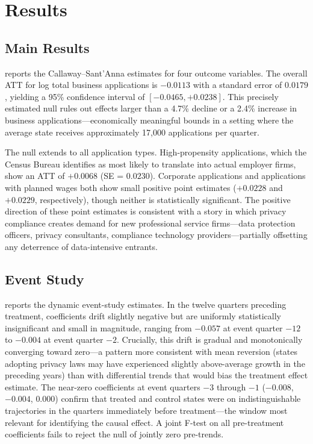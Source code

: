 \documentclass[12pt]{article}
\begin{document}
\section{Results}
\label{sec:results}

\subsection{Main Results}

 reports the Callaway--Sant'Anna estimates for four outcome variables. The overall ATT for log total business applications is $-0.0113$ with a standard error of $0.0179$, yielding a 95\% confidence interval of $[-0.0465, +0.0238]$. This precisely estimated null rules out effects larger than a 4.7\% decline or a 2.4\% increase in business applications---economically meaningful bounds in a setting where the average state receives approximately 17,000 applications per quarter.

The null extends to all application types. High-propensity applications, which the Census Bureau identifies as most likely to translate into actual employer firms, show an ATT of $+0.0068$ (SE = $0.0230$). Corporate applications and applications with planned wages both show small positive point estimates ($+0.0228$ and $+0.0229$, respectively), though neither is statistically significant. The positive direction of these point estimates is consistent with a story in which privacy compliance creates demand for new professional service firms---data protection officers, privacy consultants, compliance technology providers---partially offsetting any deterrence of data-intensive entrants.



\subsection{Event Study}

 reports the dynamic event-study estimates. In the twelve quarters preceding treatment, coefficients drift slightly negative but are uniformly statistically insignificant and small in magnitude, ranging from $-0.057$ at event quarter $-12$ to $-0.004$ at event quarter $-2$. Crucially, this drift is gradual and monotonically converging toward zero---a pattern more consistent with mean reversion (states adopting privacy laws may have experienced slightly above-average growth in the preceding years) than with differential trends that would bias the treatment effect estimate. The near-zero coefficients at event quarters $-3$ through $-1$ ($-0.008$, $-0.004$, $0.000$) confirm that treated and control states were on indistinguishable trajectories in the quarters immediately before treatment---the window most relevant for identifying the causal effect. A joint F-test on all pre-treatment coefficients fails to reject the null of jointly zero pre-trends.
\end{document}
